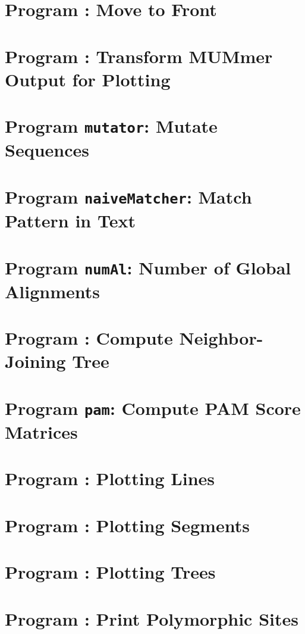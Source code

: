 \documentclass[a4paper]{report}
\begin{document}
\chapter{Program : Move to Front}\label{ch:mt}

\chapter{Program : Transform MUMmer Output for
  Plotting}\label{ch:m2p}

\chapter{Program \texttt{mutator}: Mutate Sequences}\label{ch:mut}

\chapter{Program \texttt{naiveMatcher}: Match Pattern in
  Text}\label{ch:nm}

\chapter{Program \texttt{numAl}: Number of Global
  Alignments}\label{ch:num}

\chapter{Program : Compute Neighbor-Joining Tree}\label{ch:nj}

\chapter{Program \texttt{pam}: Compute PAM Score
  Matrices}\label{ch:pam}

\chapter{Program : Plotting Lines}\label{ch:pl}

\chapter{Program : Plotting Segments}\label{ch:ps}

\chapter{Program : Plotting Trees}\label{ch:pt}

\chapter{Program : Print Polymorphic Sites}\label{ch:pp}

\end{document}
